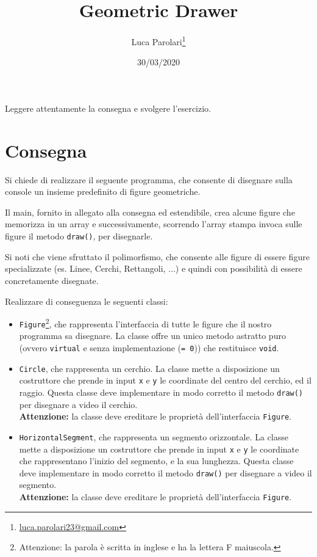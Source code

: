\documentclass[addpoints,12pt,answers]{exam}
\author{Luca Parolari\footnote{\href{mailto:luca.parolari23@gmail.com}{luca.parolari23@gmail.com}}}
\begin{document}
    
    \title{Geometric Drawer}
    \date{30/03/2020}
    
    \maketitle
    
    Leggere attentamente la consegna e svolgere l'esercizio.
    
    \section{Consegna}
    Si chiede di realizzare il seguente programma, che consente di disegnare sulla console un insieme predefinito di figure geometriche.

    Il main, fornito in allegato alla consegna ed estendibile, crea alcune figure che memorizza in un array e successivamente, scorrendo l'array stampa invoca sulle figure il metodo \texttt{draw()}, per disegnarle.

    Si noti che viene sfruttato il polimorfismo, che consente alle figure di essere figure specializzate (es. Linee, Cerchi, Rettangoli, ...) e quindi con possibilità di essere concretamente disegnate.

    Realizzare di conseguenza le seguenti classi:
    \begin{itemize}
        \item \texttt{Figure}\footnote{Attenzione: la parola è scritta in inglese e ha la lettera F maiuscola.}, che rappresenta l'interfaccia di tutte le figure che il nostro programma sa disegnare. La classe offre un unico metodo astratto puro (ovvero \texttt{virtual} e senza implementazione (\texttt{= 0})) che restituisce \texttt{void}.

        \item \texttt{Circle}, che rappresenta un cerchio. La classe mette a disposizione un costruttore che prende in input \texttt{x} e \texttt{y} le coordinate del centro del cerchio, ed il raggio. Questa classe deve implementare in modo corretto il metodo \texttt{draw()} per disegnare a video il cerchio.\\
        \textbf{Attenzione:} la classe deve ereditare le proprietà dell'interfaccia \texttt{Figure}.

        \item \texttt{HorizontalSegment}, che rappresenta un segmento orizzontale. La classe mette a disposizione un costruttore che prende in input \texttt{x} e \texttt{y} le coordinate che rappresentano l'inizio del segmento, e la sua lunghezza. Questa classe deve implementare in modo corretto il metodo \texttt{draw()} per disegnare a video il segmento.\\
        \textbf{Attenzione:} la classe deve ereditare le proprietà dell'interfaccia \texttt{Figure}.
    \end{itemize}
\end{document}
